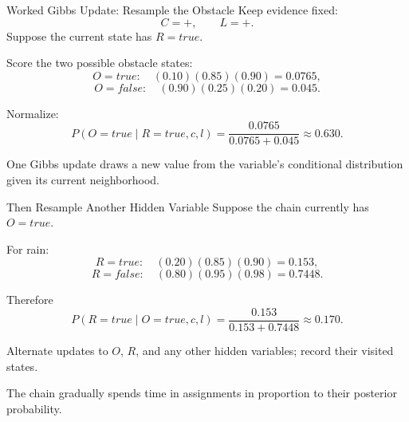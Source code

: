 \documentclass[aspectratio=169,10pt]{beamer}
\begin{document}
\begin{frame}[shrink=10]{Worked Gibbs Update: Resample the Obstacle}
  Keep evidence fixed:
  \[
    C=+,\qquad L=+.
  \]
  Suppose the current state has $R=true$.

  Score the two possible obstacle states:
  \[
    O=true:\quad (0.10)(0.85)(0.90)=0.0765,
  \]
  \[
    O=false:\quad (0.90)(0.25)(0.20)=0.045.
  \]

  Normalize:
  \[
    P(O=true\mid R=true,c,l)
    =\frac{0.0765}{0.0765+0.045}
    \approx 0.630.
  \]

  \begin{keyidea}
    One Gibbs update draws a new value from the variable's conditional distribution given its current neighborhood.
  \end{keyidea}
\end{frame}

\begin{frame}[shrink=10]{Then Resample Another Hidden Variable}
  Suppose the chain currently has $O=true$.

  For rain:
  \[
    R=true:\quad (0.20)(0.85)(0.90)=0.153,
  \]
  \[
    R=false:\quad (0.80)(0.95)(0.98)=0.7448.
  \]

  Therefore
  \[
    P(R=true\mid O=true,c,l)
    =\frac{0.153}{0.153+0.7448}
    \approx 0.170.
  \]

  Alternate updates to $O$, $R$, and any other hidden variables; record their visited states.

  \begin{keyidea}
    The chain gradually spends time in assignments in proportion to their posterior probability.
  \end{keyidea}
\end{frame}
\end{document}
